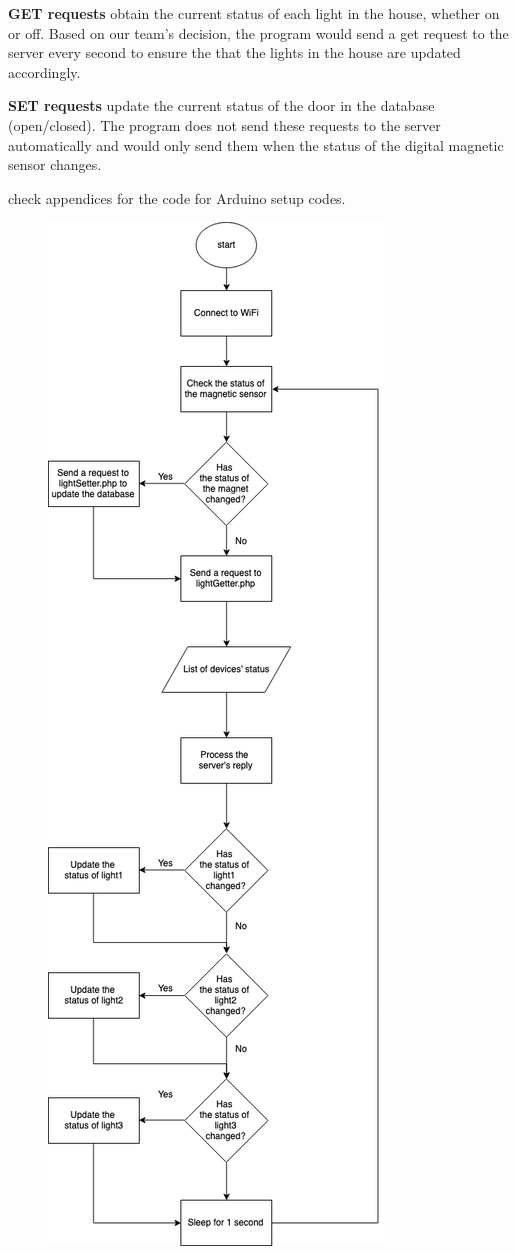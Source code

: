 \documentclass[12pt,a4paper]{report}
\begin{document}
\noindent \textbf{GET requests} obtain the current status of each light in the house, whether on or off. Based on our team's decision, the program would send a get request to the server every second to ensure the that the lights in the house are updated accordingly. 

\vspace{0.1cm}

\noindent \textbf{SET requests} update the current status of the door in the database (open/closed). The program does not send these requests to the server automatically and would only send them when the status of the digital magnetic sensor changes. 
\vspace{0.1cm}

\noindent check appendices for the code for Arduino setup codes.

\begin{figure}[H]
	\centering
	\includegraphics[scale= 0.43]{figures/arduinoFlow.png}

\end{figure}
\end{document}
